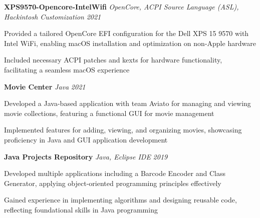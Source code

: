 \documentclass[letterpaper]{article}
\begin{document}
    {\textbf{XPS9570-Opencore-IntelWifi}} {\sl OpenCore, ACPI Source Language (ASL), Hackintosh Customization} \hfill \textsl{2021}\\
    \vspace{-2mm}
    \begin{tightitemize} \itemsep -1mm

        \item Provided a tailored OpenCore EFI configuration for the Dell XPS 15 9570 with Intel WiFi, enabling macOS installation and optimization on non-Apple hardware
        
        \item Included necessary ACPI patches and kexts for hardware functionality, facilitating a seamless macOS experience
        
    \end{tightitemize}
    \vspace{-2mm}

    {\textbf{Movie Center}} {\sl Java} \hfill \textsl{2021}\\
    \vspace{-2mm}
    \begin{tightitemize} \itemsep -1mm

        \item Developed a Java-based application with team Aviato for managing and viewing movie collections, featuring a functional GUI for movie management
        
        \item Implemented features for adding, viewing, and organizing movies, showcasing proficiency in Java and GUI application development
        
    \end{tightitemize}
    \vspace{-2mm}

    {\textbf{Java Projects Repository}} {\sl Java, Eclipse IDE} \hfill \textsl{2019}\\
    \vspace{-2mm}
    \begin{tightitemize} \itemsep -1mm

        \item Developed multiple applications including a Barcode Encoder and Class Generator, applying object-oriented programming principles effectively
        
        \item Gained experience in implementing algorithms and designing reusable code, reflecting foundational skills in Java programming
        
    \end{tightitemize}
    \vspace{-2mm}
\end{document}
